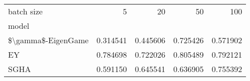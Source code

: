 \begin{tabular}{lrrrr}
\toprule
batch size &       5   &       20  &       50  &       100 \\
model              &           &           &           &           \\
\midrule
\$\textbackslash gamma\$-EigenGame &  0.314541 &  0.445606 &  0.725426 &  0.571902 \\
EY                 &  0.784698 &  0.722026 &  0.805489 &  0.792121 \\
SGHA               &  0.591150 &  0.645541 &  0.636905 &  0.755392 \\
\bottomrule
\end{tabular}
